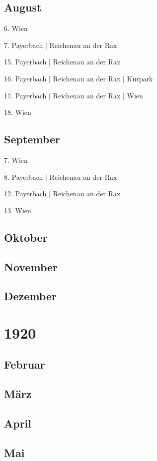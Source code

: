 \documentclass[twoside=false,titlepage=false,open=any, parskip=never, fontsize=10pt, headings=small, chapterprefix=false, appendixprefix=false, DIV=15]{scrbook}
\begin{document}
\begin{multicols}{3}
            \section*{August}
            6. Wien\par
            7. Payerbach | Reichenau an der Rax\par
            15. Payerbach | Reichenau an der Rax\par
            16. Payerbach | Reichenau an der Rax | Kurpark\par
            17. Payerbach | Reichenau an der Rax | Wien\par
            18. Wien\par
            \section*{September}
            7. Wien\par
            8. Payerbach | Reichenau an der Rax\par
            12. Payerbach | Reichenau an der Rax\par
            13. Wien\par
            \section*{Oktober}
            \section*{November}
            \section*{Dezember}
            \chapter*{1920}
            \section*{Februar}
            \section*{März}
            \section*{April}
            \section*{Mai}

\end{multicols}
\end{document}
